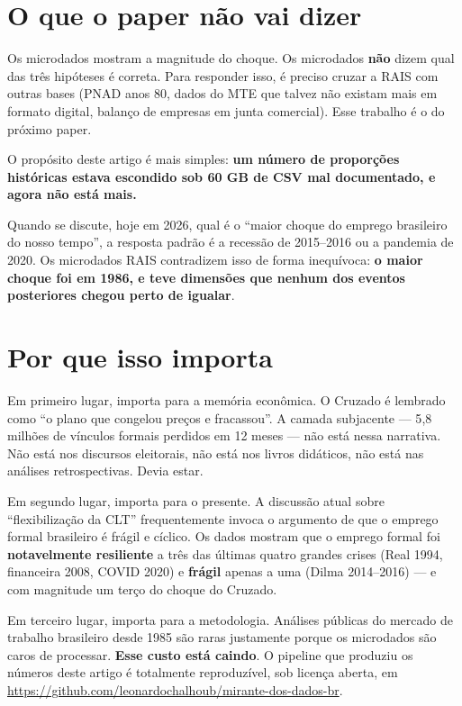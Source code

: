 \documentclass[12pt,a4paper,oneside]{article}
\begin{document}
\section*{O que o paper não vai dizer}

Os microdados mostram a magnitude do choque. Os microdados \textbf{não}
dizem qual das três hipóteses é correta. Para responder isso, é preciso
cruzar a RAIS com outras bases (PNAD anos 80, dados do MTE que talvez não
existam mais em formato digital, balanço de empresas em junta comercial).
Esse trabalho é o do próximo paper.

O propósito deste artigo é mais simples: \textbf{um número de
proporções históricas estava escondido sob 60 GB de CSV mal documentado,
e agora não está mais.}

Quando se discute, hoje em 2026, qual é o ``maior choque do emprego
brasileiro do nosso tempo'', a resposta padrão é a recessão de 2015--2016
ou a pandemia de 2020. Os microdados RAIS contradizem isso de forma
inequívoca: \textbf{o maior choque foi em 1986, e teve dimensões que
nenhum dos eventos posteriores chegou perto de igualar}.

\section*{Por que isso importa}

Em primeiro lugar, importa para a memória econômica. O Cruzado é
lembrado como ``o plano que congelou preços e fracassou''. A
camada subjacente --- 5{,}8 milhões de vínculos formais perdidos em
12 meses --- não está nessa narrativa. Não está nos discursos eleitorais,
não está nos livros didáticos, não está nas análises retrospectivas.
Devia estar.

Em segundo lugar, importa para o presente. A discussão atual sobre
``flexibilização da CLT'' frequentemente invoca o argumento de que
o emprego formal brasileiro é frágil e cíclico. Os dados mostram que
o emprego formal foi \textbf{notavelmente resiliente} a três das
últimas quatro grandes crises (Real 1994, financeira 2008, COVID 2020)
e \textbf{frágil} apenas a uma (Dilma 2014--2016) --- e com magnitude
um terço do choque do Cruzado.

Em terceiro lugar, importa para a metodologia. Análises públicas do
mercado de trabalho brasileiro desde 1985 são raras justamente porque
os microdados são caros de processar. \textbf{Esse custo está caindo}.
O pipeline que produziu os números deste artigo é totalmente
reproduzível, sob licença aberta, em
\url{https://github.com/leonardochalhoub/mirante-dos-dados-br}.
\end{document}
